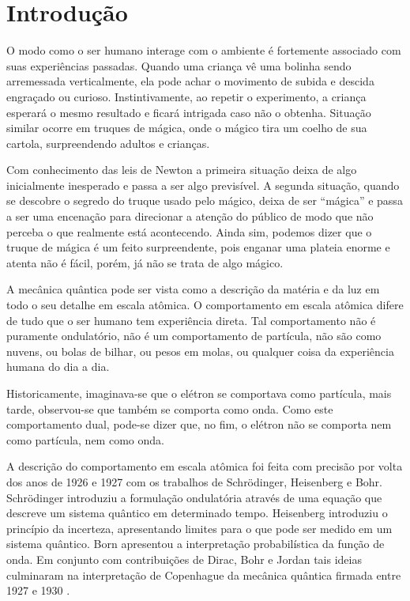 
\chapter*[Introdução]{Introdução}
\label{chap:introducao}

	O modo como o ser humano interage com o ambiente é fortemente associado com suas experiências passadas. Quando uma criança vê uma bolinha sendo arremessada verticalmente, ela pode achar o movimento de subida e descida engraçado ou curioso. Instintivamente, ao repetir o experimento, a criança esperará o mesmo resultado e ficará intrigada caso não o obtenha. Situação similar ocorre em truques de mágica, onde o mágico tira um coelho de sua cartola, surpreendendo adultos e crianças.

	Com conhecimento das leis de Newton a primeira situação deixa de algo inicialmente inesperado e passa a ser algo previsível. A segunda situação, quando se descobre o segredo do truque usado pelo mágico, deixa de ser ``mágica'' e passa a ser uma encenação para direcionar a atenção do público de modo que não perceba o que realmente está acontecendo. Ainda sim, podemos dizer que o truque de mágica é um feito surpreendente, pois enganar uma plateia enorme e atenta não é fácil, porém, já não se trata de algo mágico.

	A mecânica quântica pode ser vista como a descrição da matéria e da luz em todo o seu detalhe em escala atômica. O comportamento em escala atômica difere de tudo que o ser humano tem experiência direta. Tal comportamento não é puramente ondulatório, não é um comportamento de partícula, não são como nuvens, ou bolas de bilhar, ou pesos em molas, ou qualquer coisa da experiência humana do dia a dia.

	Historicamente, imaginava-se que o elétron se comportava como partícula, mais tarde, observou-se que também se comporta como onda. Como este comportamento dual, pode-se dizer que, no fim, o elétron não se comporta nem como partícula, nem como onda.

	A descrição do comportamento em escala atômica foi feita com precisão por volta dos anos de 1926 e 1927 com os trabalhos de Schrödinger, Heisenberg e Bohr. Schrödinger introduziu a formulação ondulatória através de uma equação que descreve um sistema quântico em determinado tempo. Heisenberg introduziu o princípio da incerteza, apresentando limites para o que pode ser medido em um sistema quântico. Born apresentou a interpretação probabilística da função de onda. Em conjunto com contribuições de Dirac, Bohr e Jordan tais ideias culminaram na interpretação de Copenhague da mecânica quântica firmada entre 1927 e 1930 \cite{faye2022copenhagen}.

